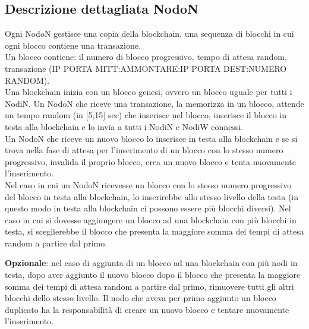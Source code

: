 \subsection*{Descrizione dettagliata NodoN}
Ogni NodoN gestisce una copia della blockchain, una sequenza di blocchi in cui ogni blocco contiene una transazione. \\Un blocco contiene: il numero di blocco progressivo, tempo di attesa random, transazione (IP PORTA MITT:AMMONTARE:IP PORTA DEST:NUMERO RANDOM). \\Una blockchain inizia con un blocco genesi, ovvero un blocco uguale per tutti i NodiN. Un NodoN che riceve una transazione, la memorizza in un blocco, attende un tempo random (in [5,15] sec) che inserisce nel blocco, inserisce il blocco in testa alla blockchain e lo invia a tutti i NodiN e NodiW connessi. \\Un NodoN che riceve un nuovo blocco lo inserisce in testa alla blockchain e se si trova nella fase di attesa per l’inserimento di un blocco con lo stesso numero progressivo, invalida il proprio blocco, crea un nuovo blocco e tenta nuovamente l’inserimento. \\Nel caso in cui un NodoN ricevesse un blocco con lo stesso numero progressivo del blocco in testa alla blockchain, lo inserirebbe allo stesso livello della testa (in questo modo in testa alla blockchain ci possono essere più blocchi diversi). Nel caso in cui si dovesse aggiungere un blocco ad una blockchain con più blocchi in testa, si sceglierebbe il blocco che presenta la maggiore somma dei tempi di attesa random a partire dal primo.

\textbf{Opzionale}: nel caso di aggiunta di un blocco ad una blockchain con più nodi in testa, dopo aver aggiunto il nuovo blocco dopo il blocco che presenta la maggiore somma dei tempi di attesa random a partire dal primo, rimuovere tutti gli altri blocchi dello stesso livello. Il nodo che aveva per primo aggiunto un blocco duplicato ha la responsabilità di creare un nuovo blocco e tentare nuovamente l’inserimento.

